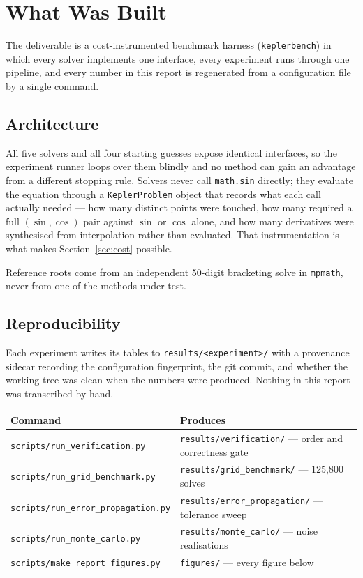 \documentclass[11pt,a4paper]{article}
\begin{document}
\section{What Was Built}

The deliverable is a cost-instrumented benchmark harness
(\texttt{keplerbench}) in which every solver implements one interface,
every experiment runs through one pipeline, and every number in this
report is regenerated from a configuration file by a single command.

\subsection{Architecture}

All five solvers and all four starting guesses expose identical
interfaces, so the experiment runner loops over them blindly and no method
can gain an advantage from a different stopping rule. Solvers never call
\texttt{math.sin} directly; they evaluate the equation through a
\texttt{KeplerProblem} object that records what each call actually needed
--- how many distinct points were touched, how many required a full
$(\sin,\cos)$ pair against $\sin$ or $\cos$ alone, and how many
derivatives were synthesised from interpolation rather than evaluated.
That instrumentation is what makes Section~\ref{sec:cost} possible.

Reference roots come from an independent 50-digit bracketing solve in
\texttt{mpmath}, never from one of the methods under test.

\subsection{Reproducibility}

Each experiment writes its tables to \texttt{results/<experiment>/} with a
provenance sidecar recording the configuration fingerprint, the git
commit, and whether the working tree was clean when the numbers were
produced. Nothing in this report was transcribed by hand.

\begin{center}
\small
\begin{tabularx}{\textwidth}{@{}>{\raggedright\arraybackslash}p{6.1cm} >{\raggedright\arraybackslash}X@{}}
\toprule
\textbf{Command} & \textbf{Produces} \\
\midrule
\texttt{scripts/run\_verification.py} & \texttt{results/verification/} --- order and correctness gate \\
\texttt{scripts/run\_grid\_benchmark.py} & \texttt{results/grid\_benchmark/} --- 125{,}800 solves \\
\texttt{scripts/run\_error\_propagation.py} & \texttt{results/error\_propagation/} --- tolerance sweep \\
\texttt{scripts/run\_monte\_carlo.py} & \texttt{results/monte\_carlo/} --- noise realisations \\
\texttt{scripts/make\_report\_figures.py} & \texttt{figures/} --- every figure below \\
\bottomrule
\end{tabularx}
\end{center}
\end{document}
